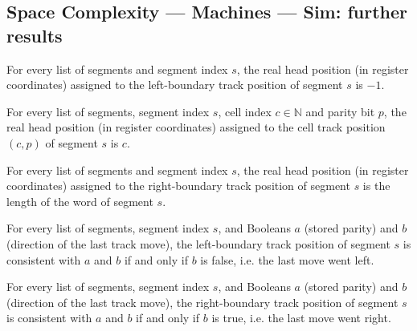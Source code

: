 \subsection*{Space Complexity --- Machines --- Sim: further results}

\begin{lemma}
\label{Complexity.LogProg.trackPos_left}
\leanok
{}
For every list of segments and segment index $s$, the real head position (in register
coordinates) assigned to the left-boundary track position of segment $s$ is $-1$.
\end{lemma}

\begin{lemma}
\label{Complexity.LogProg.trackPos_cell}
\leanok
{}
For every list of segments, segment index $s$, cell index $c\in\mathbb{N}$ and parity bit
$p$, the real head position (in register coordinates) assigned to the cell track
position $(c,p)$ of segment $s$ is $c$.
\end{lemma}

\begin{lemma}
\label{Complexity.LogProg.trackPos_right}
\leanok
{}
For every list of segments and segment index $s$, the real head position (in register
coordinates) assigned to the right-boundary track position of segment $s$ is the length
of the word of segment $s$.
\end{lemma}

\begin{lemma}
\label{Complexity.LogProg.consistent_left_iff}
\leanok
{}
For every list of segments, segment index $s$, and Booleans $a$ (stored parity) and $b$
(direction of the last track move), the left-boundary track position of segment $s$ is
consistent with $a$ and $b$ if and only if $b$ is false, i.e. the last move went left.
\end{lemma}

\begin{lemma}
\label{Complexity.LogProg.consistent_right_iff}
\leanok
{}
For every list of segments, segment index $s$, and Booleans $a$ (stored parity) and $b$
(direction of the last track move), the right-boundary track position of segment $s$ is
consistent with $a$ and $b$ if and only if $b$ is true, i.e. the last move went right.
\end{lemma}

